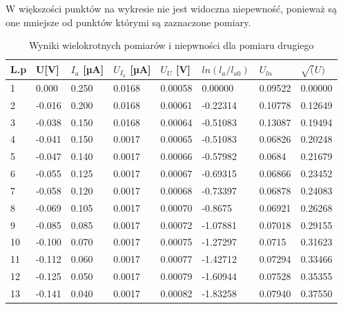 \documentclass[a4paper]{article}
\begin{document}
W większości punktów na wykresie nie jest widoczna niepewność, ponieważ są one mniejsze od punktów którymi są zaznaczone pomiary.



\begin{table}[h!]
\centering
 \begin{tabular}{ | l | l | l | l | l | l | l | l | }
 \hline
L.p & U[V] & $I_{a}$ [µA] & $U_{I_{a}}$ [µA] & $U_{U}$ [V] & $ln(l_{a}/l_{a0})$ & $U_{ln}$ & $\sqrt(U)$ \\ \hline
1 & 0.000 & 0.250 & 0.0168 & 0.00058 & 0.00000 & 0.09522 & 0.00000 \\ \hline
2 & -0.016 & 0.200 & 0.0168 & 0.00061 & -0.22314 & 0.10778 & 0.12649 \\ \hline
3 & -0.038 & 0.150 & 0.0168 & 0.00064 & -0.51083 & 0.13087 & 0.19494 \\ \hline
4 & -0.041 & 0.150 & 0.0017 & 0.00065 & -0.51083 & 0.06826 & 0.20248 \\ \hline
5 & -0.047 & 0.140 & 0.0017 & 0.00066 & -0.57982 & 0.0684 & 0.21679 \\ \hline
6 & -0.055 & 0.125 & 0.0017 & 0.00067 & -0.69315 & 0.06866 & 0.23452 \\ \hline
7 & -0.058 & 0.120 & 0.0017 & 0.00068 & -0.73397 & 0.06878 & 0.24083 \\ \hline
8 & -0.069 & 0.105 & 0.0017 & 0.00070 & -0.8675 & 0.06921 & 0.26268 \\ \hline
9 & -0.085 & 0.085 & 0.0017 & 0.00072 & -1.07881 & 0.07018 & 0.29155 \\ \hline
10 & -0.100 & 0.070 & 0.0017 & 0.00075 & -1.27297 & 0.0715 & 0.31623 \\ \hline
11 & -0.112 & 0.060 & 0.0017 & 0.00077 & -1.42712 & 0.07294 & 0.33466 \\ \hline
12 & -0.125 & 0.050 & 0.0017 & 0.00079 & -1.60944 & 0.07528 & 0.35355 \\ \hline
13 & -0.141 & 0.040 & 0.0017 & 0.00082 & -1.83258 & 0.07940 & 0.37550 \\ \hline
 \end{tabular}
\caption{Wyniki wielokrotnych pomiarów i niepwności dla pomiaru drugiego}
\end{table}
\end{document}
